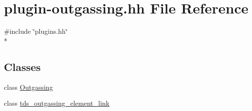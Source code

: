 \hypertarget{plugin-outgassing_8hh}{\section{plugin-\/outgassing.hh File Reference}
\label{plugin-outgassing_8hh}
}
{\ttfamily \#include \char`\"{}plugins.\-hh\char`\"{}}\\*
\subsection*{Classes}
\begin{DoxyCompactItemize}
\item 
class \hyperlink{classOutgassing}{Outgassing}
\item 
class \hyperlink{classtds__outgassing__element__link}{tds\-\_\-outgassing\-\_\-element\-\_\-link}
\end{DoxyCompactItemize}
